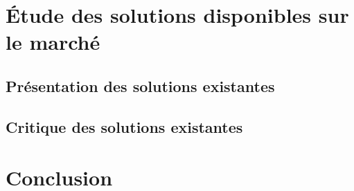 \begin{spacing}{1.5}
\section{Étude des solutions disponibles sur le marché}
\subsection{Présentation des solutions existantes}

\subsection{Critique des solutions existantes}



\section*{Conclusion}


\end{spacing}
